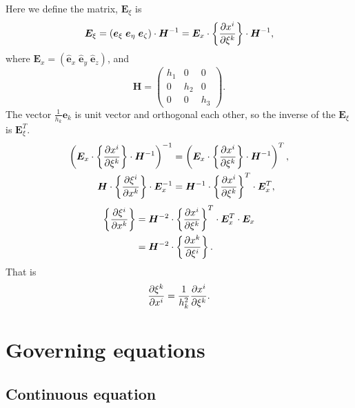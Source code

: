 Here we define the matrix, $\bm{E}_\xi$ is
\begin{equation}
  \bm{E}_\xi =
  (\bm{e}_\xi \; \bm{e}_\eta \; \bm{e}_\zeta)\cdot \bm{H}^{-1}
  = \bm{E}_x \cdot \left\{\frac{\partial x^i}{\partial \xi^k}\right\} \cdot \bm{H}^{-1},
\end{equation}
where $\bm{E}_x = (\bm{\hat{e}}_x \; \bm{\hat{e}}_y \; \bm{\hat{e}}_z)$, and
\begin{equation}
  \bm{H} = \left(\begin{array}{ccc} h_1 & 0 & 0\\ 0 & h_2 & 0\\ 0 & 0 & h_3\end{array}\right).
\end{equation}
The vector $\frac{1}{h_k}\bm{e}_k$ is unit vector and orthogonal each other,
so the inverse of the $\bm{E}_\xi$ is $\bm{E}_\xi^T$.
\begin{align}
  \left( \bm{E}_x \cdot \left\{\frac{\partial x^i}{\partial \xi^k}\right\} \cdot \bm{H}^{-1} \right)^{-1} &= \left( \bm{E}_x \cdot \left\{\frac{\partial x^i}{\partial \xi^k}\right\} \cdot \bm{H}^{-1} \right)^T, \nonumber\\
  \bm{H} \cdot \left\{\frac{\partial \xi^i}{\partial x^k}\right\} \cdot \bm{E}_x^{-1} &= \bm{H}^{-1} \cdot \left\{\frac{\partial x^i}{\partial \xi^k}\right\}^T \cdot \bm{E}_x^T, \nonumber
\end{align}
\begin{align}
  \left\{\frac{\partial \xi^i}{\partial x^k}\right\} &= \bm{H}^{-2} \cdot \left\{\frac{\partial x^i}{\partial \xi^k}\right\}^T \cdot \bm{E}_x^T \cdot \bm{E}_x \nonumber \\
  &= \bm{H}^{-2} \cdot \left\{\frac{\partial x^k}{\partial \xi^i}\right\}.
\end{align}
That is
\begin{equation}
  \frac{\partial \xi^k}{\partial x^i} = \frac{1}{h_k^2} \frac{\partial x^i}{\partial \xi^k}.
\end{equation}


\section{Governing equations}

\subsection{Continuous equation}

